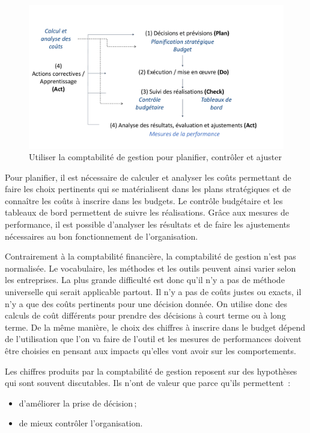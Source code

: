 \documentclass[oneside]{kaobook}
\begin{document}
\begin{figure}[H]

\includegraphics{./img/pdca.pdf}
\caption{\label{fig:org29ecd1e}Utiliser la comptabilité de gestion pour planifier, contrôler et ajuster}
\end{figure}

Pour planifier, il est nécessaire de calculer et analyser les coûts permettant de faire les choix pertinents qui se matérialisent dans les plans stratégiques et de connaître les coûts à inscrire dans les budgets. Le contrôle budgétaire et les tableaux de bord permettent de suivre les réalisations. Grâce aux mesures de performance, il est possible d'analyser les résultats et de faire les ajustements nécessaires au bon fonctionnement de l'organisation.

\begin{kaobox}
Contrairement à la comptabilité financière, la comptabilité de gestion n'est pas normalisée. Le vocabulaire, les méthodes et les outils peuvent ainsi varier selon les entreprises. La plus grande difficulté est donc qu'il n'y a pas de méthode universelle qui serait applicable partout. Il n'y a pas de coûts justes ou exacts, il n'y a que des coûts pertinents pour une décision donnée. On utilise donc des calculs de coût différents pour prendre des décisions à court terme ou à long terme. De la même manière, le choix des chiffres à inscrire dans le budget dépend de l'utilisation que l'on va faire de l'outil et les mesures de performances doivent être choisies en pensant aux impacts qu'elles vont avoir sur les comportements. 
\end{kaobox}

Les chiffres produits par la comptabilité de gestion reposent sur des hypothèses qui sont souvent discutables. Ils n'ont de valeur que parce qu'ils permettent :
\begin{itemize}
\item d'améliorer la prise de décision ;
\item de mieux contrôler l'organisation.
\end{itemize}
\end{document}
